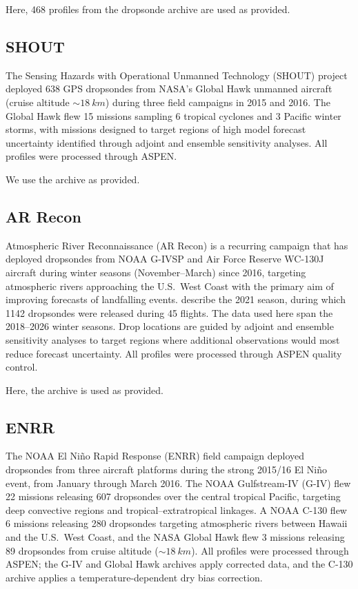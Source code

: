 \documentclass[11pt]{article}
\begin{document}
Here, 468 profiles from the dropsonde archive are used as provided.

\subsection{SHOUT}

The Sensing Hazards with Operational Unmanned Technology (SHOUT) project \citep{wick2020} deployed 638 GPS dropsondes from NASA's Global Hawk unmanned aircraft (cruise altitude ${\sim}\SI{18}{km}$) during three field campaigns in 2015 and 2016.  The Global Hawk flew 15 missions sampling 6 tropical cyclones and 3 Pacific winter storms, with missions designed to target regions of high model forecast uncertainty identified through adjoint and ensemble sensitivity analyses.  All profiles were processed through ASPEN.

We use the archive as provided.

\subsection{AR Recon}

Atmospheric River Reconnaissance (AR Recon) is a recurring campaign that has deployed dropsondes from NOAA G-IVSP and Air Force Reserve WC-130J aircraft during winter seasons (November--March) since 2016, targeting atmospheric rivers approaching the U.S.\ West Coast with the primary aim of improving forecasts of landfalling events.  \citet{cobb2022} describe the 2021 season, during which 1142 dropsondes were released during 45 flights.  The data used here span the 2018--2026 winter seasons.  Drop locations are guided by adjoint and ensemble sensitivity analyses to target regions where additional observations would most reduce forecast uncertainty.  All profiles were processed through ASPEN quality control.

Here, the archive is used as provided.

\subsection{ENRR}

The NOAA El Ni\~no Rapid Response (ENRR) field campaign \citep{dole2018} deployed dropsondes from three aircraft platforms during the strong 2015/16 El Ni\~no event, from January through March 2016.  The NOAA Gulfstream-IV (G-IV) flew 22 missions releasing 607 dropsondes over the central tropical Pacific, targeting deep convective regions and tropical--extratropical linkages.  A NOAA C-130 flew 6 missions releasing 280 dropsondes targeting atmospheric rivers between Hawaii and the U.S.\ West Coast, and the NASA Global Hawk flew 3 missions releasing 89 dropsondes from cruise altitude (${\sim}\SI{18}{km}$).  All profiles were processed through ASPEN; the G-IV and Global Hawk archives apply corrected data, and the C-130 archive applies a temperature-dependent dry bias correction.
\end{document}
